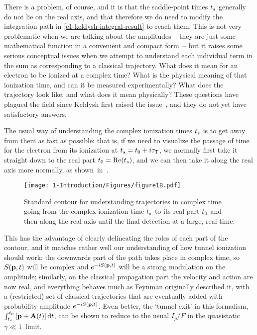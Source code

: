 There is a problem, of course, and it is that the saddle-point times $\ts$ generally do not lie on the real axis, and that therefore we do need to modify the integration path in \eqref{e1-keldysh-integral-result} to reach them. This is not very problematic when we are talking about the amplitudes -- they are just some mathematical function in a convenient and compact form~-- but it raises some serious conceptual issues when we attempt to understand each individual term in the sum as corresponding to a classical trajectory. What does it mean for an electron to be ionized at a complex time? What is the physical meaning of that ionization time, and can it be measured experimentally? What does the trajectory look like, and what does it mean physically? These questions have plagued the field since Keldysh first raised the issue~\cite{keldysh_ionization_1965}, and they do not yet have satisfactory answers.


The usual way of understanding the complex ionization times $\ts$ is to get away from them as fast as possible: that is, if we need to visualize the passage of time for the electron from its ionization at ${t_s} = {t_0} +i{\tau_\mathrm{T}}$, we normally first take it straight down to the real part ${t_0}=\Re({t_s})$, and we can then take it along the real axis more normally, as shown~in~.

\begin{figure}[ht]
  \centering
  \texttt{[image: 1-Introduction/Figures/figure1B.pdf]}
  \caption[Standard contour from the complex ionization time $\ts$ to its real part $\tn$ and then along the real axis]{
  Standard contour for understanding trajectories in complex time going from the complex ionization time $\ts$ to its real part $\tn$ and then along the real axis until the final detection at a large, real time.
  }
\label{f1-initial-contour}
\end{figure}

This has the advantage of clearly delineating the roles of each part of the contour, and it matches rather well our understanding of how tunnel ionization should work: the downwards part of the path takes place in complex time, so $S(\vb{p},t)$ will be complex and $e^{-iS(\vb{p},t)}$ will be a strong modulation on the amplitude; similarly, on the classical propagation part the velocity and action are now real, and everything behaves much as Feynman originally described it, with a (restricted) set of classical trajectories that are eventually added with probability amplitude $e^{-iS(\vb{p},t)}$. Even better, the `tunnel exit' in this formalism, $\int_{{t_s}}^{{t_0}}\left[\vb{p}+\vb{A}(t)\right]\mathrm{d} t$, can be shown to reduce to the usual $I_p/F$ in the quasistatic $\gamma \ll 1$~limit.


